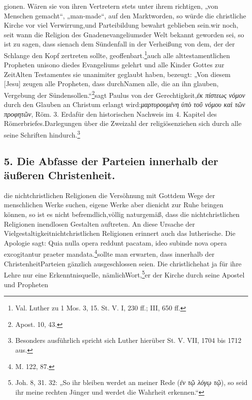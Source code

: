 gionen. Wären sie von ihren Vertretern stets unter ihrem richtigen, „von Menschen gemacht“, „man-made“, auf den Markt\ngebracht worden, so würde die christliche Kirche vor viel Verwirrung,\nStreit und Parteibildung bewahrt geblieben sein.\n\nFragen wir noch, seit wann die Religion des Gnadenevangeliums\nin der Welt bekannt geworden sei, so ist zu sagen, dass sie\nunmittelbar nach dem Sündenfall in der Verheißung von dem\nWeibesamen, der der Schlange den Kopf zertreten sollte, geoffenbart\nwurde.\footnote{Val. Luther zu 1 Mos. 3, 15. St. V. I, 230 ff.; III, 650 ff.}\nDoch auch alle alttestamentlichen Propheten unisono die\nReligion des Evangeliums gelehrt und alle Kinder Gottes zur Zeit\ndes Alten Testamentes sie unanimiter geglaubt haben, bezeugt\nPetrus: „Von diesem [Jesu] zeugen alle Propheten, dass durch\nseinen Namen alle, die an ihn glauben, Vergebung der Sünden\nempfangen sollen.“\footnote{Apost. 10, 43.}\nEbenso sagt Paulus von der Gerechtigkeit,\ndie \textit{ἐκ πίστεως νόμον} durch den Glauben an Christum erlangt wird:\n\textit{μαρτυρουμένη ὑπὸ τοῦ νόμου καὶ τῶν προφητῶν}, Röm. 3. Er\nbringt dafür den historischen Nachweis im 4. Kapitel des Römerbriefes.\nLuthers Darlegungen über die Zweizahl der religiösen\nErkenntnisquellen ziehen sich durch alle seine Schriften hindurch.\footnote{Besonders ausführlich spricht sich Luther hierüber St. V. VII, 1704 bis 1712 aus.}\n\n\subsection*{5. Die Abfasse der Parteien innerhalb der äußeren Christenheit.}\n\nWeil die nichtchristlichen Religionen die Versöhnung mit Gott\nauf dem Wege der menschlichen Werke suchen, eigene Werke aber die\nGewissen nicht zur Ruhe bringen können, so ist es nicht befremdlich,\nsondern völlig naturgemäß, dass die nichtchristlichen Religionen in\nsich endlosen Gestalten auftreten. An diese Ursache der Vielgestaltigkeit\nder nichtchristlichen Religionen erinnert auch das lutherische\nBekenntnis. Die Apologie sagt: Quia nulla opera reddunt pacatam\nconscientiam, ideo subinde nova opera excogitantur praeter mandata\nDei.\footnote{M. 122, 87.}\nHingegen sollte man erwarten, dass innerhalb der Christenheit\nverschiedene Parteien gänzlich ausgeschlossen seien. Die christliche\nKirche hat ja für ihre Lehre nur eine Erkenntnisquelle, nämlich\nChristi Wort,\footnote{Joh. 8, 31. 32: „So ihr bleiben werdet an meiner Rede (\textit{ἐν τῷ λόγῳ τῷ}), so seid ihr meine rechten Jünger und werdet die Wahrheit erkennen.“}\ndas er der Kirche durch seine Apostel und Propheten